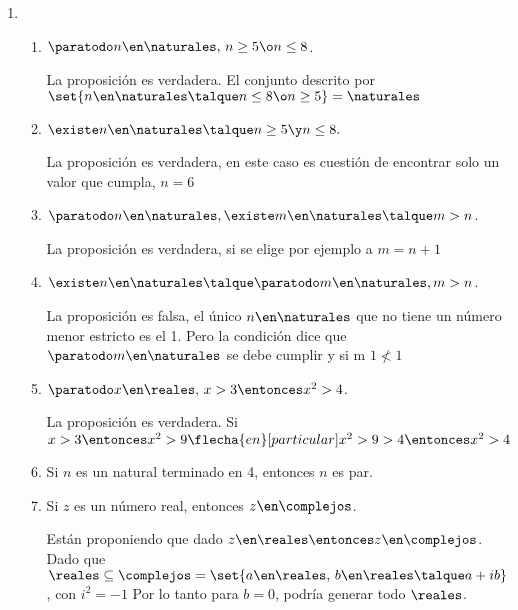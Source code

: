 \begin{enumerate}[label=\roman*)]
  \item

        \begin{enumerate}[label=(\alph*)]
          \item $\paratodo n \en \naturales,\, n \geq 5 \o n \leq 8$.\par
                La proposición es verdadera. El conjunto descrito por $\set{ n \en \naturales \talque n \leq 8 \o n \geq 5} = \naturales$\par
                \doceiA                        \par

          \item $\existe n \en \naturales \talque n \geq 5 \y n\leq 8.$\par
                La proposición es verdadera, en este caso es cuestión de encontrar solo un valor que cumpla, $n = 6$

          \item $\paratodo n \en \naturales, \existe m \en \naturales \talque m > n$.\par
                La proposición es verdadera, si se elige por ejemplo a $m = n+1$

          \item $\existe n \en \naturales \talque \paratodo m \en \naturales, m >n$.\par
                La proposición es falsa, el único $n \en \naturales$ que no tiene un número menor estricto es el 1. Pero la condición
                dice que $\paratodo m \en \naturales$ se debe cumplir y si m $1 \nless 1$

          \item $\paratodo x \en \reales,\, x > 3 \entonces x^2 > 4$.\par
                La proposición es verdadera. Si $x > 3 \entonces x^2 > 9 \flecha{en}[particular] x^2 > 9 > 4 \entonces x^2 > 4$

          \item Si $n$ es un natural terminado en 4, entonces $n$ es par.\par
                  \hacer

          \item Si $z$ es un número real, entonces $z \en \complejos$.\par
                Están proponiendo que dado
                $z \en \reales \entonces z \en \complejos$.
                Dado que
                $\reales \subseteq \complejos =
                  \set{a \en \reales,\, b\en \reales \talque a + i b}$,
                con $i^2 = -1$
                Por lo tanto para $b = 0$, podría generar todo $\reales$.
        \end{enumerate}


\end{enumerate}
